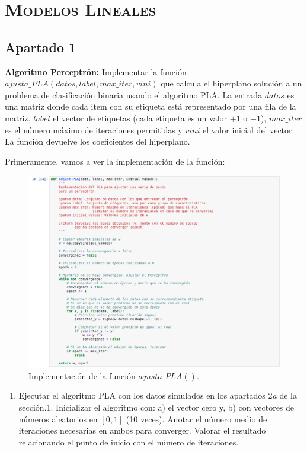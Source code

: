 \documentclass[11pt,a4paper]{article}
\begin{document}
\section{\textsc{Modelos Lineales}}

\subsection*{Apartado 1}

\noindent \textbf{Algoritmo Perceptrón:} Implementar la función
$ajusta\_PLA(datos, label, max\_iter, vini)$ que calcula el hiperplano solución a un problema de
clasificación binaria usando el algoritmo PLA. La entrada $datos$ es una matriz donde cada item con
su etiqueta está representado por una fila de la matriz, $label$ el vector de etiquetas (cada etiqueta
es un valor $+1$ o $-1$), $max\_iter$ es el número máximo de iteraciones permitidas y $vini$ el valor
inicial del vector. La función devuelve los coeficientes del hiperplano.

Primeramente, vamos a ver la implementación de la función:

\begin{figure}[H]
\centering
\includegraphics[scale=0.4]{img/adjust_pla.png}
\caption{Implementación de la función $ajusta\_PLA()$.}
\end{figure}

\begin{enumerate}[label=\textit{\alph*})]
	\item Ejecutar el algoritmo PLA con los datos simulados en los apartados 2\textit{a} de la
	sección.1. Inicializar el algoritmo con: a) el vector cero y, b) con vectores de números
	aleatorios en $[0, 1]$ (10 veces). Anotar el número medio de iteraciones necesarias en ambos para
	converger. Valorar el resultado relacionando el punto de inicio con el número de iteraciones.
\end{enumerate}
\end{document}
